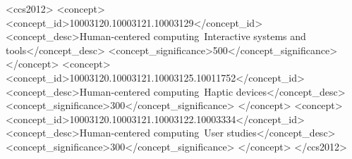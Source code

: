 \documentclass[acmsmall]{acmart}
\begin{document}
\begin{CCSXML}
<ccs2012>
<concept>
<concept_id>10003120.10003121.10003129</concept_id>
<concept_desc>Human-centered computing~Interactive systems and tools</concept_desc>
<concept_significance>500</concept_significance>
</concept>
<concept>
<concept_id>10003120.10003121.10003125.10011752</concept_id>
<concept_desc>Human-centered computing~Haptic devices</concept_desc>
<concept_significance>300</concept_significance>
</concept>
<concept>
<concept_id>10003120.10003121.10003122.10003334</concept_id>
<concept_desc>Human-centered computing~User studies</concept_desc>
<concept_significance>300</concept_significance>
</concept>
</ccs2012>
\end{CCSXML}



\maketitle













\end{document}
